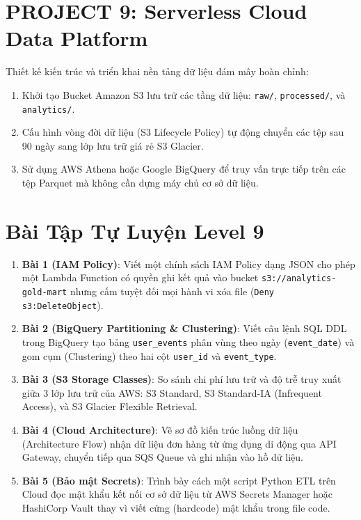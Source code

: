 \section{PROJECT 9: Serverless Cloud Data Platform}

Thiết kế kiến trúc và triển khai nền tảng dữ liệu đám mây hoàn chỉnh:
\begin{enumerate}
    \item Khởi tạo Bucket Amazon S3 lưu trữ các tầng dữ liệu: \texttt{raw/}, \texttt{processed/}, và \texttt{analytics/}.
    \item Cấu hình vòng đời dữ liệu (S3 Lifecycle Policy) tự động chuyển các tệp sau 90 ngày sang lớp lưu trữ giá rẻ S3 Glacier.
    \item Sử dụng AWS Athena hoặc Google BigQuery để truy vấn trực tiếp trên các tệp Parquet mà không cần dựng máy chủ cơ sở dữ liệu.
\end{enumerate}

\section{Bài Tập Tự Luyện Level 9}

\begin{baitapbox}
\begin{enumerate}
    \item \textbf{Bài 1 (IAM Policy)}: Viết một chính sách IAM Policy dạng JSON cho phép một Lambda Function có quyền ghi kết quả vào bucket \texttt{s3://analytics-gold-mart} nhưng cấm tuyệt đối mọi hành vi xóa file (\texttt{Deny s3:DeleteObject}).
    \item \textbf{Bài 2 (BigQuery Partitioning \& Clustering)}: Viết câu lệnh SQL DDL trong BigQuery tạo bảng \texttt{user\_events} phân vùng theo ngày (\texttt{event\_date}) và gom cụm (Clustering) theo hai cột \texttt{user\_id} và \texttt{event\_type}.
    \item \textbf{Bài 3 (S3 Storage Classes)}: So sánh chi phí lưu trữ và độ trễ truy xuất giữa 3 lớp lưu trữ của AWS: S3 Standard, S3 Standard-IA (Infrequent Access), và S3 Glacier Flexible Retrieval.
    \item \textbf{Bài 4 (Cloud Architecture)}: Vẽ sơ đồ kiến trúc luồng dữ liệu (Architecture Flow) nhận dữ liệu đơn hàng từ ứng dụng di động qua API Gateway, chuyển tiếp qua SQS Queue và ghi nhận vào hồ dữ liệu.
    \item \textbf{Bài 5 (Bảo mật Secrets)}: Trình bày cách một script Python ETL trên Cloud đọc mật khẩu kết nối cơ sở dữ liệu từ AWS Secrets Manager hoặc HashiCorp Vault thay vì viết cứng (hardcode) mật khẩu trong file code.
\end{enumerate}
\end{baitapbox}

